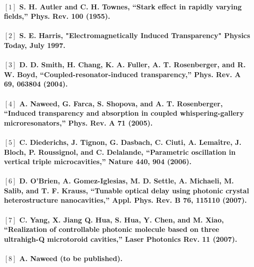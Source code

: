 \paragraph{\normalfont \large $[1]$ S. H. Autler and C. H. Townes, “Stark effect in rapidly varying fields,” Phys. Rev. \textbf{100} (1955). \\ 
\\$[2]$ S. E. Harris, "Electromagnetically Induced Transparency" Physics Today, July 1997. \\
\\$[3]$ D. D. Smith, H. Chang, K. A. Fuller, A. T. Rosenberger, and R. W. Boyd, “Coupled-resonator-induced transparency,” Phys. Rev. A \textbf{69}, 063804 (2004). \\
\\$[4]$  A. Naweed, G. Farca, S. Shopova, and A. T. Rosenberger, “Induced transparency and absorption in coupled
whispering-gallery microresonators,” Phys. Rev. A \textbf{71} (2005).\\
\\$[5]$ C. Diederichs, J. Tignon, G. Dasbach, C. Ciuti, A. Lemaître, J. Bloch, P. Roussignol, and C. Delalande, “Parametric oscillation in vertical triple microcavities,” Nature \textbf{440}, 904 (2006).\\
\\$[6]$ D. O’Brien, A. Gomez-Iglesias, M. D. Settle, A. Michaeli, M. Salib, and T. F. Krauss, “Tunable optical delay using photonic crystal heterostructure nanocavities,” Appl. Phys. Rev. B \textbf{76}, 115110 (2007).\\
\\$[7]$ C. Yang,  X. Jiang Q. Hua, S. Hua, Y. Chen, and M. Xiao, “Realization of controllable photonic molecule based on three ultrahigh-Q microtoroid cavities,” Laser Photonics Rev. \textbf{11} (2007).\\
\\$[8]$ A. Naweed (to be published).}